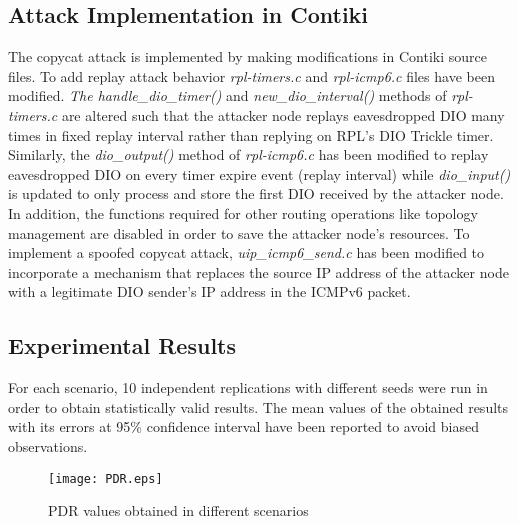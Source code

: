 \documentclass[]{svjour3}                     %
\begin{document}
\subsection{Attack Implementation in Contiki}
The copycat attack is implemented by making modifications in Contiki source files. To add replay attack behavior \textit{rpl-timers.c} and \textit{rpl-icmp6.c} files have been modified. \textit{The handle\_dio\_timer()} and \textit{new\_dio\_interval()} methods of \textit{rpl-timers.c} are altered such that the attacker node replays eavesdropped DIO many times in fixed replay interval rather than replying on RPL's DIO Trickle timer. Similarly, the \textit{dio\_output()} method of \textit{rpl-icmp6.c} has been modified to replay eavesdropped DIO on every timer expire event (replay interval) while \textit{dio\_input()} is updated to only process and store the first DIO received by the attacker node. In addition, the functions required for other routing operations like topology management are disabled in order to save the attacker node's resources. To implement a spoofed copycat attack, \textit{uip\_icmp6\_send.c} has been modified to incorporate a mechanism that replaces the source IP address of the attacker node with a legitimate DIO sender's IP address in the ICMPv6 packet.             

\subsection{Experimental Results}
For each scenario, 10 independent replications with different seeds were run in order to obtain statistically valid results. The mean values of the obtained results with its errors at 95\% confidence interval have been reported to avoid biased observations. 

\begin{figure}[!h]
	\centering
	\texttt{[image: PDR.eps]}
	\caption{PDR values obtained in different scenarios}
	\label{PDR}
\end{figure}  
\end{document}
